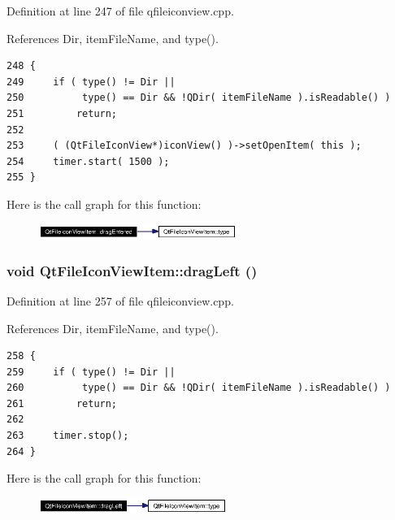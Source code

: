 Definition at line 247 of file qfileiconview.cpp.

References Dir, item\-File\-Name, and type().



\footnotesize\begin{verbatim}248 {
249     if ( type() != Dir ||
250          type() == Dir && !QDir( itemFileName ).isReadable() )
251         return;
252 
253     ( (QtFileIconView*)iconView() )->setOpenItem( this );
254     timer.start( 1500 );
255 }
\end{verbatim}\normalsize 


Here is the call graph for this function:\begin{figure}[H]
\begin{center}
\leavevmode
\includegraphics[width=182pt]{classQtFileIconViewItem_QtFileIconViewItema7_cgraph}
\end{center}
\end{figure}
\subsubsection{\setlength{\rightskip}{0pt plus 5cm}void Qt\-File\-Icon\-View\-Item::drag\-Left ()\hspace{0.3cm}{\tt  [virtual]}}\label{classQtFileIconViewItem_QtFileIconViewItema8}




Definition at line 257 of file qfileiconview.cpp.

References Dir, item\-File\-Name, and type().



\footnotesize\begin{verbatim}258 {
259     if ( type() != Dir ||
260          type() == Dir && !QDir( itemFileName ).isReadable() )
261         return;
262 
263     timer.stop();
264 }
\end{verbatim}\normalsize 


Here is the call graph for this function:\begin{figure}[H]
\begin{center}
\leavevmode
\includegraphics[width=173pt]{classQtFileIconViewItem_QtFileIconViewItema8_cgraph}
\end{center}
\end{figure}
